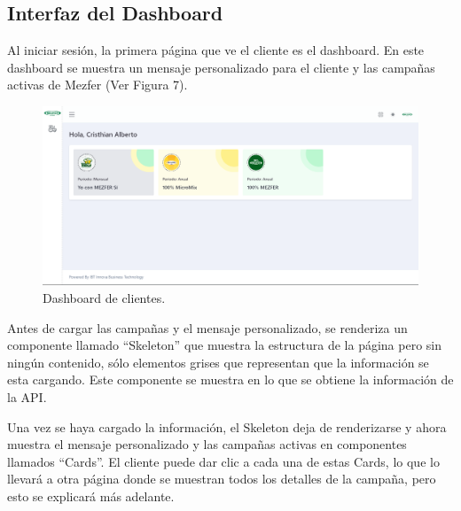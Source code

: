 \subsection{Interfaz del Dashboard}
Al iniciar sesión, la primera página que ve el cliente es el dashboard. En este dashboard se muestra un mensaje personalizado para el cliente y las campañas activas de Mezfer (Ver Figura 7).

    \begin{figure}[H]
        \begin{center}
            \includegraphics[scale=0.35]{img/actividades/dashboard-cliente/dashboard-cliente.png}
            \caption{Dashboard de clientes.}
            \label{fig:dashboard-clientes}
        \end{center}
    \end{figure}

Antes de cargar las campañas y el mensaje personalizado, se renderiza un componente llamado ``Skeleton'' que muestra la estructura de la página pero sin ningún contenido, sólo elementos grises que representan que la información se esta cargando. Este componente se muestra en lo que se obtiene la información de la API.

Una vez se haya cargado la información, el Skeleton deja de renderizarse y ahora muestra el mensaje personalizado y las campañas activas en componentes llamados ``Cards''. El cliente puede dar clic a cada una de estas Cards, lo que lo llevará a otra página donde se muestran todos los detalles de la campaña, pero esto se explicará más adelante.